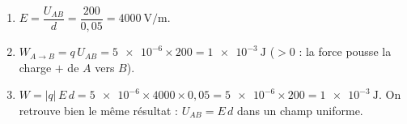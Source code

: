 \documentclass[11pt,a4paper]{article}
\begin{document}
\begin{corrige}
\begin{enumerate}[label=\alph*)]
  \item $E = \dfrac{U_{AB}}{d} = \dfrac{200}{0{,}05} = \SI{4000}{\volt\per\metre}$.
  \item $W_{A\to B} = q\,U_{AB} = \num{5e-6}\times 200 = \SI{1e-3}{\joule}$ ($>0$ : la force
        pousse la charge $+$ de $A$ vers $B$).
  \item $W = |q|\,E\,d = \num{5e-6}\times 4000\times 0{,}05 = \num{5e-6}\times 200 = \SI{1e-3}{\joule}$.
        On retrouve bien le même résultat : $U_{AB} = E\,d$ dans un champ uniforme.
\end{enumerate}
\end{corrige}
\end{document}
